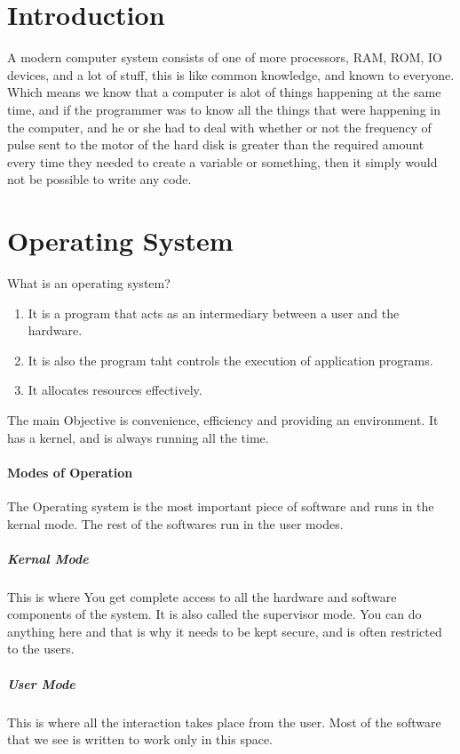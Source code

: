 \documentclass[11pt]{article}
\begin{document}
\clearpage
\tableofcontents
\clearpage


\section{Introduction}

A modern computer system consists of one of more processors, RAM, ROM, IO devices, and a lot of stuff, this is like common knowledge, and known to everyone. Which means we know that a computer is alot of things happening at the same time, and if the programmer was to know all the things that were happening in the computer, and he or she had to deal with whether or not the frequency of pulse sent to the motor of the hard disk is greater than the required amount every time they needed to create a variable or something, then it simply would not be possible to write any code.



\section{Operating System}
What is an operating system?

\begin{enumerate}
	\item It is a program that acts as an intermediary between a user and the hardware.
	\item It is also the program taht controls the execution of application programs.
	\item It allocates resources effectively.
\end{enumerate}

The main Objective is convenience, efficiency and providing an environment. It has a kernel, and is always running all the time.

\paragraph{Modes of Operation}

The Operating system is the most important piece of software and runs in the kernal mode. The rest of the softwares run in the user modes.
\subparagraph{Kernal Mode}
This is where You get complete access to all the hardware and software components of the system. It is also called the supervisor mode. You can do anything here and that is why it needs to be kept secure, and is often restricted to the users.

\subparagraph{User Mode}
This is where all the interaction takes place from the user. Most of the software that we see is written to work only in this space.
\end{document}
